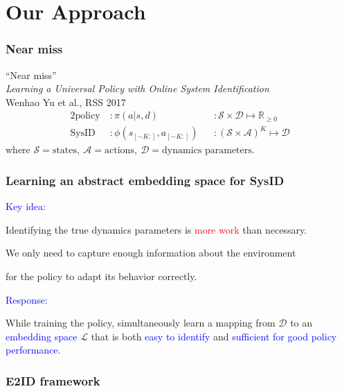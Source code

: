 \documentclass{beamer}
\newcommand{\R}{\mathbb{R}}
\newcommand{\cA}{\mathcal{A}}
\newcommand{\cD}{\mathcal{D}}
\newcommand{\cL}{\mathcal{L}}
\newcommand{\cS}{\mathcal{S}}
\newcommand{\good}[1]{\textcolor{blue}{#1}}
\newcommand{\bad}[1]{\textcolor{red}{#1}}
\begin{document}
\section{Our Approach}

\begin{frame}
\frametitle{Near miss}
\begin{center}
{\Large ``Near miss''} \\
\emph{Learning a Universal Policy with Online System Identification} \\
Wenhao Yu et al., RSS 2017
\begin{alignat*}{2}
\text{policy}\ &: \pi(a|s,d) & & : \cS \times \cD \mapsto \R_{\geq 0} \\%
\text{SysID}\ &: \phi(s_{[-K:]}, a_{[-K:]}) & & : (\cS \times \cA)^K \mapsto \cD
\end{alignat*}
where $\cS = \text{states},\ \cA = \text{actions},\ \cD = \text{dynamics parameters}.$
\end{center}

\end{frame}

\begin{frame}
\frametitle{Learning an abstract embedding space for SysID}
\centering
\good{\Large Key idea:}

Identifying the true dynamics parameters is \bad{more work} than necessary.

We only need to capture enough information about the environment

for the policy to adapt its behavior correctly.

\vspace{0.7cm}
\good{\Large Response:}

While training the policy, simultaneously learn a mapping
from $\cD$ to an \good{embedding space} $\cL$
that is both \good{easy to identify} and
\good{sufficient for good policy performance}.

\end{frame}

\begin{frame}
\frametitle{E2ID framework}
\centering
{}
\end{frame}
\end{document}
